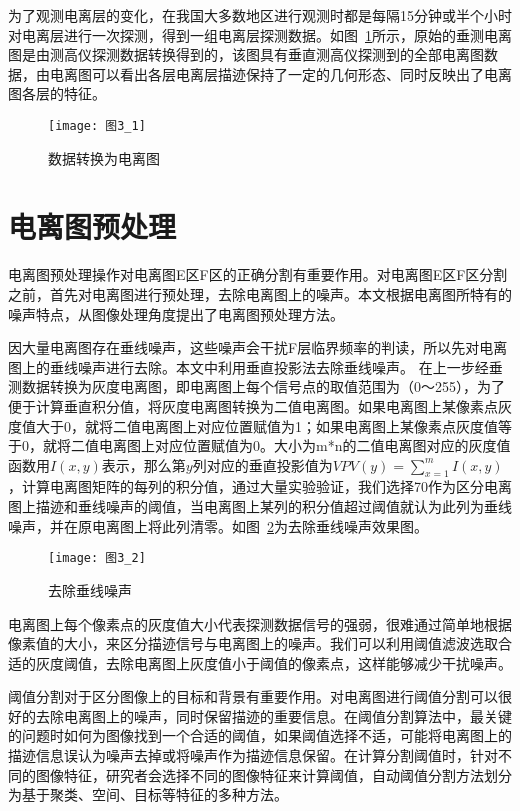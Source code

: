 为了观测电离层的变化，在我国大多数地区进行观测时都是每隔15分钟或半个小时对电离层进行一次探测，得到一组电离层探测数据。如图~\ref{图3_1}所示，原始的垂测电离图是由测高仪探测数据转换得到的，该图具有垂直测高仪探测到的全部电离图数据，由电离图可以看出各层电离层描迹保持了一定的几何形态、同时反映出了电离图各层的特征。

\begin{figure}[h]
\centering
\texttt{[image: 图3\_1]}
\caption{数据转换为电离图}
\label{图3_1}    
\end{figure}
\section{电离图预处理}
\label{3_2}
电离图预处理操作对电离图E区F区的正确分割有重要作用。对电离图E区F区分割之前，首先对电离图进行预处理，去除电离图上的噪声。本文根据电离图所特有的噪声特点，从图像处理角度提出了电离图预处理方法。
         
因大量电离图存在垂线噪声，这些噪声会干扰F层临界频率的判读，所以先对电离图上的垂线噪声进行去除。本文中利用垂直投影法去除垂线噪声。 在上一步经垂测数据转换为灰度电离图，即电离图上每个信号点的取值范围为（0～255），为了便于计算垂直积分值，将灰度电离图转换为二值电离图。如果电离图上某像素点灰度值大于0，就将二值电离图上对应位置赋值为1；如果电离图上某像素点灰度值等于0，就将二值电离图上对应位置赋值为0。大小为m*n的二值电离图对应的灰度值函数用$I(x,y)$表示，那么第$y$列对应的垂直投影值为$VPV(y)=\sum_{x=1}^{m}I(x,y)$，计算电离图矩阵的每列的积分值，通过大量实验验证，我们选择70作为区分电离图上描迹和垂线噪声的阈值，当电离图上某列的积分值超过阈值就认为此列为垂线噪声，并在原电离图上将此列清零。如图~\ref{图3_2}为去除垂线噪声效果图。

\begin{figure}[h]
\centering
\texttt{[image: 图3\_2]}
\caption{去除垂线噪声}
\label{图3_2}    
\end{figure}
  
电离图上每个像素点的灰度值大小代表探测数据信号的强弱，很难通过简单地根据像素值的大小，来区分描迹信号与电离图上的噪声。我们可以利用阈值滤波选取合适的灰度阈值，去除电离图上灰度值小于阈值的像素点，这样能够减少干扰噪声。
            
阈值分割对于区分图像上的目标和背景有重要作用。对电离图进行阈值分割可以很好的去除电离图上的噪声，同时保留描迹的重要信息。在阈值分割算法中，最关键的问题时如何为图像找到一个合适的阈值，如果阈值选择不适，可能将电离图上的描迹信息误认为噪声去掉或将噪声作为描迹信息保留。在计算分割阈值时，针对不同的图像特征，研究者会选择不同的图像特征来计算阈值，自动阈值分割方法划分为基于聚类、空间、目标等特征的多种方法\cite{sezgin2004survey}。
    

